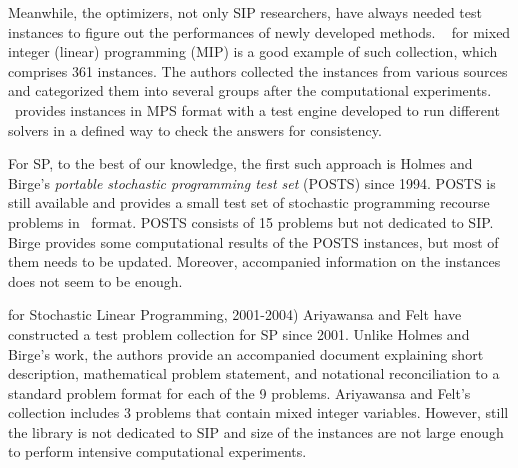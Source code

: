 Meanwhile, the optimizers, not only SIP researchers, have always needed test instances to 
figure out the performances of newly developed methods. \miplib\ \cite{MIPLIB} for mixed 
integer (linear) programming (MIP) is a good example of such collection, which comprises 361 
instances. The authors collected the instances from various sources and categorized them into 
several groups after the computational experiments. \miplib\ provides instances in 
\textsf{MPS} format with a test engine developed to run different solvers in a defined way to 
check the answers for consistency. 

For SP, to the best of our knowledge, the first such approach is Holmes and Birge's 
\textit{portable stochastic programming test set} (POSTS) \cite{POSTS} since 1994. POSTS is 
still available and provides a small test set of stochastic programming recourse problems in 
\smps\ format. POSTS consists of 15 problems but not dedicated to SIP. Birge 
\cite{POSTSresults} provides some computational results of the POSTS instances, but most of 
them needs to be updated. Moreover, accompanied information on the instances does not seem to 
be enough. 

for Stochastic Linear Programming, 2001-2004)
Ariyawansa and Felt \cite{journal:AF2004} have constructed a test problem collection for SP 
since 2001. Unlike Holmes and Birge's work, the authors provide an accompanied document 
explaining short description, mathematical problem statement, and notational reconciliation 
to a standard problem format for each of the 9 problems. Ariyawansa and Felt's collection 
includes 3 problems that contain mixed integer variables. However, still the library is not 
dedicated to SIP and size of the instances are not large enough to perform intensive 
computational experiments. 

